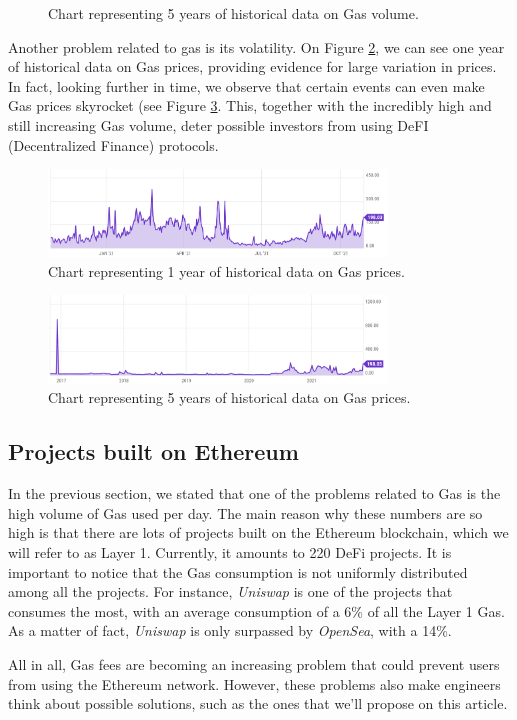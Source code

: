 \begin{figure}[htbp]
    \caption{Chart representing 5 years of historical data on Gas volume.}
    \label{fig:gas_volume}
\end{figure}

Another problem related to gas is its volatility. On Figure \ref{fig:gas_prices}, we can see one year of historical data on Gas prices, providing evidence for large variation in prices. In fact, looking further in time, we observe that certain events can even make Gas prices skyrocket (see Figure \ref{fig:gas_prices5}. This, together with the incredibly high and still increasing Gas volume, deter possible investors from using DeFI (Decentralized Finance) protocols. 

\begin{figure}[htbp]
    \centerline{\includegraphics[width=90mm]{figures/gas_prices.PNG}}
    \caption{Chart representing 1 year of historical data on Gas prices.}
    \label{fig:gas_prices}
\end{figure}

\begin{figure}[htbp]
    \centerline{\includegraphics[width=90mm]{figures/gas_prices5.PNG}}
    \caption{Chart representing 5 years of historical data on Gas prices.}
    \label{fig:gas_prices5}
\end{figure}


\subsection{Projects built on Ethereum}
In the previous section, we stated that one of the problems related to Gas is the high volume of Gas used per day. The main reason why these numbers are so high is that there are lots of projects built on the Ethereum blockchain, which we will refer to as Layer 1. Currently, it amounts to 220 DeFi projects. It is important to notice that the Gas consumption is not uniformly distributed among all the projects. For instance, \textit{Uniswap}\cite{adamsUniswapV2Core} is one of the projects that consumes the most, with an average consumption of a 6\% of all the Layer 1 Gas. As a matter of fact, \textit{Uniswap} is only surpassed by \textit{OpenSea}\cite{OpenSeaDeveloperDocumentation}, with a 14\%. 

All in all, Gas fees are becoming an increasing problem that could prevent users from using the Ethereum network. However, these problems also make engineers think about possible solutions, such as the ones that we'll propose on this article.